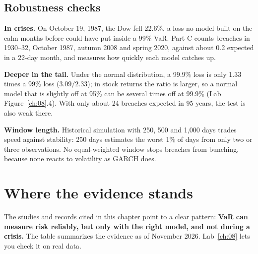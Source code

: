 \subsection{Robustness checks}
\label{sec:11-stress}

\textbf{In crises.} On October 19, 1987, the Dow fell 22.6\%, a loss no model built on the calm months before could have put inside a 99\% VaR. Part C counts breaches in 1930--32, October 1987, autumn 2008 and spring 2020, against about 0.2 expected in a 22-day month, and measures how quickly each model catches up.

\textbf{Deeper in the tail.} Under the normal distribution, a 99.9\% loss is only 1.33 times a 99\% loss ($3.09/2.33$); in stock returns the ratio is larger, so a normal model that is slightly off at 95\% can be several times off at 99.9\% (Lab Figure~\ref{ch:08}.4). With only about 24 breaches expected in 95 years, the test is also weak there.

\textbf{Window length.} Historical simulation with 250, 500 and 1,000 days trades speed against stability: 250 days estimates the worst 1\% of days from only two or three observations. No equal-weighted window stops breaches from bunching, because none reacts to volatility as GARCH does.

\section{Where the evidence stands}
\label{sec:11-verdict}

The studies and records cited in this chapter point to a clear pattern: \textbf{VaR can measure risk reliably, but only with the right model, and not during a crisis.} The table summarizes the evidence as of November 2026. Lab~\ref{ch:08} lets you check it on real data.

